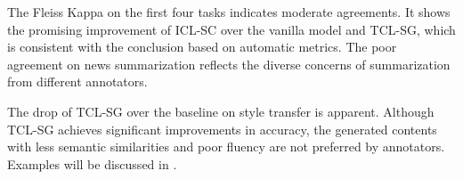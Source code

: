 The Fleiss Kappa on the first four tasks indicates moderate agreements. It shows the promising improvement of ICL-SC over the vanilla model and TCL-SG, which is consistent with the conclusion based on automatic metrics. The poor agreement on news summarization reflects the 
diverse concerns of summarization from different 
annotators. 

The drop of TCL-SG over the baseline on style transfer is apparent. Although TCL-SG achieves significant improvements in accuracy, the generated contents with less semantic similarities and poor fluency are not preferred by annotators. Examples will be discussed in .



 

